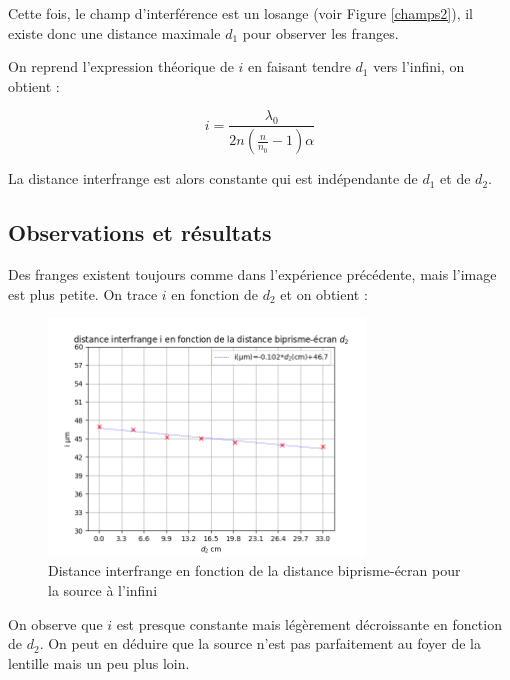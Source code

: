 \documentclass[11pt, a4paper]{article}
\begin{document}
Cette fois, le champ d'interférence est un losange (voir Figure \ref{champs2}), il existe donc une distance maximale $d_1$ pour observer les franges.

On reprend l'expression théorique de $i$ en faisant tendre $d_1$ vers l'infini, on obtient :

$$
    i =  \frac{\lambda_0}{2n\left(\frac{n}{n_0}-1\right)\alpha}
$$

La distance interfrange est alors constante qui est indépendante de $d_1$ et de $d_2$.
\subsection{Observations et résultats}
Des franges existent toujours comme dans l'expérience précédente, mais l'image est plus petite. On trace $i$ en fonction de $d_2$ et on obtient :

\begin{figure}[h] %
    \centering %
    \includegraphics[width=0.75\textwidth]{images/2.2} %
    \caption{Distance interfrange en fonction de la distance biprisme-écran pour la source à l'infini} %
    \label{courbe2}%
\end{figure}

On observe que $i$ est presque constante mais légèrement décroissante en fonction de $d_2$. On peut en déduire que la source n'est pas parfaitement au foyer de la lentille mais un peu plus loin.
\end{document}
